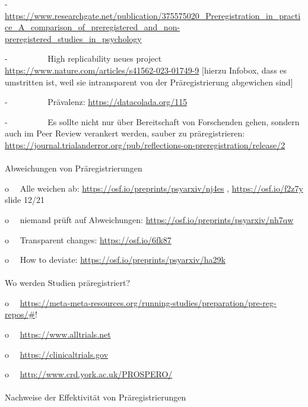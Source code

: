 \documentclass[
  letterpaper,
  DIV=11,
  numbers=noendperiod]{scrreprt}
\makeatletter
\let\oldparagraph\paragraph
\renewcommand{\paragraph}{
    \@ifstar
      \xxxParagraphStar
      \xxxParagraphNoStar
  }
\newcommand{\xxxParagraphStar}[1]{\oldparagraph*{#1}\mbox{}}
\newcommand{\xxxParagraphNoStar}[1]{\oldparagraph{#1}\mbox{}}
\makeatother
\begin{document}
-~~~~~~~~~
\url{https://www.researchgate.net/publication/375575020_Preregistration_in_practice_A_comparison_of_preregistered_and_non-preregistered_studies_in_psychology}

-~~~~~~~~~ High replicability neues project
\url{https://www.nature.com/articles/s41562-023-01749-9} {[}hierzu
Infobox, dass es umstritten ist, weil sie intransparent von der
Präregistrierung abgewichen sind{]}

-~~~~~~~~~ Prävalenz: \url{https://datacolada.org/115}

-~~~~~~~~~ Es sollte nicht nur über Bereitschaft von Forschenden gehen,
sondern auch im Peer Review verankert werden, sauber zu präregistrieren:
\url{https://journal.trialanderror.org/pub/reflections-on-preregistration/release/2}

\paragraph{Abweichungen von
Präregistrierungen}\label{abweichungen-von-pruxe4registrierungen}

o~~ Alle weichen ab: \url{https://osf.io/preprints/psyarxiv/nj4es} ,
\url{https://osf.io/f2z7y} slide 12/21

o~~ niemand prüft auf Abweichungen:
\url{https://osf.io/preprints/psyarxiv/nh7qw}

o~~ Transparent changes: \url{https://osf.io/6fk87}

o~~ How to deviate: \url{https://osf.io/preprints/psyarxiv/ha29k}

\paragraph{Wo werden Studien
präregistriert?}\label{wo-werden-studien-pruxe4registriert}

o~~
\href{https://meta-meta-resources.org/running-studies/preparation/pre-reg-repos/}{https://meta-meta-resources.org/running-studies/preparation/pre-reg-repos/\#}!

o~~ \url{https://www.alltrials.net}

o~~ \url{https://clinicaltrials.gov}

o~~ \url{http://www.crd.york.ac.uk/PROSPERO/}

\paragraph{Nachweise der Effektivität von
Präregistrierungen}\label{nachweise-der-effektivituxe4t-von-pruxe4registrierungen}
\end{document}
